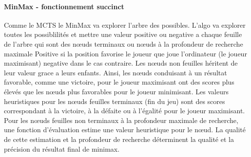 \paragraph {MinMax - fonctionnement succinct}
Comme le MCTS le MinMax va explorer l'arbre des possibles. L'algo va explorer toutes les possiblilités et mettre une valeur positive ou negative
a chaque feuille de l'arbre qui sont des nœuds terminaux ou nœuds à la profondeur de recherche maximale Positive si la position favorise le joueur 
que joue l'ordinateur (le joueur maximisant) negative dans le cas contraire. Les nœuds non feuilles héritent de leur valeur grace a leurs enfants.
Ainsi, les nœuds conduisant à un résultat favorable, comme une victoire, pour le joueur maximisant ont des scores plus élevés que les nœuds 
plus favorables pour le joueur minimisant. Les valeurs heuristiques pour les nœuds feuilles terminaux (fin du jeu) sont des scores correspondant 
à la victoire, à la défaite ou à l'égalité pour le joueur maximisant. Pour les nœuds feuilles non terminaux à la profondeur maximale de recherche, 
une fonction d'évaluation estime une valeur heuristique pour le nœud. La qualité de cette estimation et la profondeur de recherche déterminent la 
qualité et la précision du résultat final de minimax.